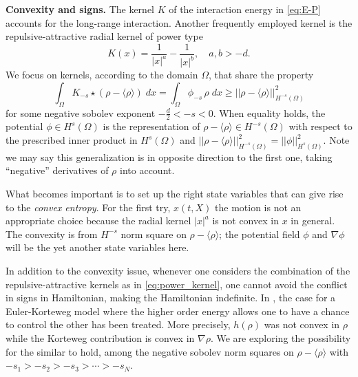 \documentclass[a4paper,11pt]{article}
\begin{document}
{\bf Convexity and signs.}
The kernel $K$ of the interaction energy in \eqref{eq:E-P} accounts for the long-range interaction. Another frequently employed kernel is the repulsive-attractive radial kernel of power type
\begin{equation}
K(x) = \frac{1}{|x|^a} - \frac{1}{|x|^b}, \quad a,b>-d. \label{eq:power_kernel}
\end{equation}
We focus on kernels, according to the domain $\Omega$, that share the property
$$ \int_\Omega K_{-s}\star(\rho-\langle\rho\rangle)\; dx =\int_\Omega \phi_{-s}\,\rho\; dx \ge ||\rho-\langle\rho\rangle||^2_{H^{-s}(\Omega)}$$%
for some negative sobolev exponent $-\frac{d}{2}<-s<0$. When equality holds, the potential $\phi\in H^s(\Omega)$ is the representation of $\rho-\langle\rho\rangle \in H^{-s}(\Omega)$ with respect to the prescribed inner product in $H^s(\Omega)$ and $||\rho-\langle\rho\rangle||^2_{H^{-s}(\Omega)}=||\phi||^2_{H^s(\Omega)}$. Note we may say this generalization is in opposite direction to the first one, taking ``negative'' derivatives of $\rho$ into account.

What becomes important is to set up the right state variables that can give rise to the {\it convex entropy}. For the first try, $x(t,X)$ the motion is not an appropriate choice because the radial kernel $|x|^a$ is not convex in $x$ in general. The convexity is from $H^{-s}$ norm square on $\rho-\langle\rho\rangle$; the potential field $\phi$ and $\nabla \phi$ will be the yet another state variables here.

In addition to the convexity issue, whenever one considers the combination of the repulsive-attractive kernels as in \eqref{eq:power_kernel}, one cannot avoid the conflict in signs in Hamiltonian, making the Hamiltonian indefinite.  In \cite{GTz}, the case for a Euler-Korteweg model where the higher order energy allows one to have a chance to control the other has been treated. More precisely, $h(\rho)$ was not convex in $\rho$ while the Korteweg contribution is convex in $\nabla\rho$. We are exploring the possibility for the similar to hold, among the negative sobolev norm squares on $\rho-\langle\rho\rangle$ with $-s_1 > -s_2 > -s_3 > \cdots > -s_N$.
\end{document}
